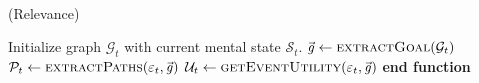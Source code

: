 \documentclass{article}
\begin{document}
\newcommand{\And}{\textit{\textbf{\footnotesize{ AND }}}}
\newcommand{\Or}{\textit{\textbf{\footnotesize{ OR }}}}
\renewcommand{\algorithmicforall}{\textbf{for each}}
\newcommand*\rfrac[2]{{}^{#1}\!/_{#2}}
\newcommand{\mathlowercal}[1]{\textit{\scriptsize{#1}}}

\\

\begin{algorithm}
	\caption{(Relevance)}
	\label{array-sum}
	\begin{algorithmic}[1]
			\Statex
			\State Initialize graph $\mathcal{G}_{t}$ with current mental state
			$\mathcal{S}_{t}$.
			\Statex
			\State $\vec{\mathit{g}} \gets \Call{extractGoal}{\mathcal{G}_{t}}$
			\Statex
			\State $\mathcal{P}_{t} \gets \Call{extractPaths}{\varepsilon_t,
			\vec{\mathit{g}}}$
			\Statex
				\State {}
			\Else
				\State $\mathcal{U}_{t} \gets \Call{getEventUtility}{\varepsilon_t,
				\vec{\mathit{g}}}$ 
				\State {}
				\Else
					\State {}
				\EndIf
			\EndIf
		\EndFunction
		\State \textbf{end function}
	\end{algorithmic}
\end{algorithm}
\end{document}
